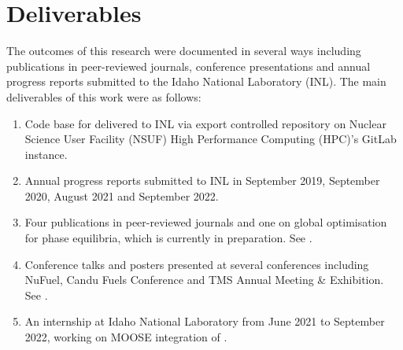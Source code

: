 \section{Deliverables}
	The outcomes of this research were documented in several ways including publications in peer-reviewed journals, conference presentations and annual progress reports submitted to the Idaho National Laboratory (INL). The main deliverables of this work were as follows:
	\begin{enumerate}
	\item Code base for {\GEM} delivered to INL via export controlled repository on Nuclear Science User Facility (NSUF) High Performance Computing (HPC)'s GitLab instance.
	\item Annual progress reports submitted to INL in September 2019, September 2020, August 2021 and September 2022. 
	\item Four publications in peer-reviewed journals and one on global optimisation for phase equilibria, which is currently in preparation. See .
	\item Conference talks and posters presented at several conferences including NuFuel, Candu Fuels Conference and TMS Annual Meeting \& Exhibition. See .
	\item An internship at Idaho National Laboratory from June 2021 to September 2022, working on MOOSE integration of \GEM.
	\end{enumerate}
	